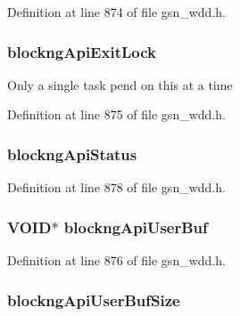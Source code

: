 Definition at line 874 of file gsn\_\-wdd.h.

\hypertarget{a00108_ad31b28c2c1d66a49676adefa0939184e}{
\subsubsection[{blockngApiExitLock}]{ {\bf blockngApiExitLock}}}
\label{a00108_ad31b28c2c1d66a49676adefa0939184e}
Only a single task pend on this at a time 

Definition at line 875 of file gsn\_\-wdd.h.

\hypertarget{a00108_a9058d044509dc3901de07c426d816472}{
\subsubsection[{blockngApiStatus}]{ {\bf blockngApiStatus}}}
\label{a00108_a9058d044509dc3901de07c426d816472}


Definition at line 878 of file gsn\_\-wdd.h.

\hypertarget{a00108_a578079528c6283b8779beb3a12945bf9}{
\subsubsection[{blockngApiUserBuf}]{\setlength{\rightskip}{0pt plus 5cm}VOID$\ast$ {\bf blockngApiUserBuf}}}
\label{a00108_a578079528c6283b8779beb3a12945bf9}


Definition at line 876 of file gsn\_\-wdd.h.

\hypertarget{a00108_ad828642fbf78687924f94c89931c9e13}{
\subsubsection[{blockngApiUserBufSize}]{ {\bf blockngApiUserBufSize}}}
\label{a00108_ad828642fbf78687924f94c89931c9e13}


